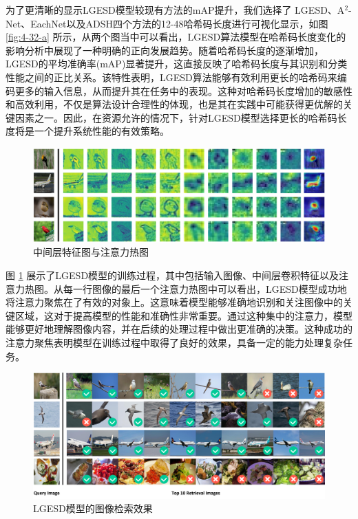 为了更清晰的显示LGESD模型较现有方法的mAP提升，我们选择了 LGESD、A${}^2$-Net、EachNet以及ADSH四个方法的12-48哈希码长度进行可视化显示，如图 \ref{fig:4-32-a} 所示，从两个图当中可以看出，LGESD算法模型在哈希码长度变化的影响分析中展现了一种明确的正向发展趋势。随着哈希码长度的逐渐增加，LGESD的平均准确率(mAP)显著提升，这直接反映了哈希码长度与其识别和分类性能之间的正比关系。该特性表明，LGESD算法能够有效利用更长的哈希码来编码更多的输入信息，从而提升其在任务中的表现。这种对哈希码长度增加的敏感性和高效利用，不仅是算法设计合理性的体现，也是其在实践中可能获得更优解的关键因素之一。因此，在资源允许的情况下，针对LGESD模型选择更长的哈希码长度将是一个提升系统性能的有效策略。


\begin{figure}[h]
  \centering
  \includegraphics[width=1.0\textwidth]{./Img/中间层特征图.pdf}
  \caption{中间层特征图与注意力热图}\label{fig:4-20}
\end{figure}

图 \ref{fig:4-20} 展示了LGESD模型的训练过程，其中包括输入图像、中间层卷积特征以及注意力热图。从每一行图像的最后一个注意力热图中可以看出，LGESD模型成功地将注意力聚焦在了有效的对象上。这意味着模型能够准确地识别和关注图像中的关键区域，这对于提高模型的性能和准确性非常重要。通过这种集中的注意力，模型能够更好地理解图像内容，并在后续的处理过程中做出更准确的决策。这种成功的注意力聚焦表明模型在训练过程中取得了良好的效果，具备一定的能力处理复杂任务。

\begin{figure}[h]
  \centering
  \includegraphics[width=1.0\textwidth]{./Img/最终检索图.pdf}
  \caption{LGESD模型的图像检索效果}\label{fig:4-33}
\end{figure}


